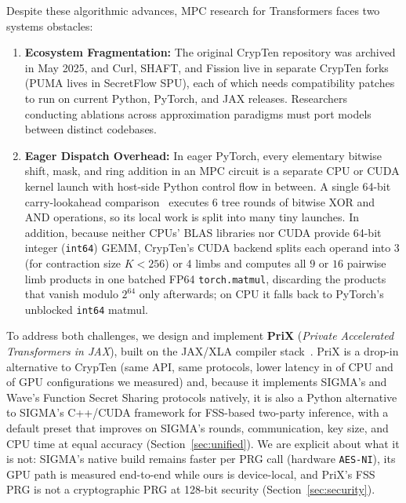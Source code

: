 \documentclass[11pt]{article}
\begin{document}
Despite these algorithmic advances, MPC research for Transformers faces two systems obstacles:
\begin{enumerate}
    \item \textbf{Ecosystem Fragmentation:} The original CrypTen repository was archived in May 2025, and Curl, SHAFT, and Fission live in separate CrypTen forks (PUMA lives in SecretFlow SPU), each of which needs compatibility patches to run on current Python, PyTorch, and JAX releases. Researchers conducting ablations across approximation paradigms must port models between distinct codebases.
    \item \textbf{Eager Dispatch Overhead:} In eager PyTorch, every elementary bitwise shift, mask, and ring addition in an MPC circuit is a separate CPU or CUDA kernel launch with host-side Python control flow in between. A single 64-bit carry-lookahead comparison~\cite{kogge1973parallel} executes 6 tree rounds of bitwise XOR and AND operations, so its local work is split into many tiny launches. In addition, because neither CPUs' BLAS libraries nor CUDA provide 64-bit integer (\texttt{int64}) GEMM, CrypTen's CUDA backend splits each operand into 3 (for contraction size $K < 256$) or 4 limbs and computes all $9$ or $16$ pairwise limb products in one batched FP64 \texttt{torch.matmul}, discarding the products that vanish modulo $2^{64}$ only afterwards; on CPU it falls back to PyTorch's unblocked \texttt{int64} matmul.
\end{enumerate}

To address both challenges, we design and implement \textbf{PriX} (\emph{Private Accelerated Transformers in JAX}), built on the JAX/XLA compiler stack~\cite{bradbury2018jax}. PriX is a drop-in alternative to CrypTen (same API, same protocols, lower latency in \cpuNumFaster{} of \cpuNumConfigs{} CPU and \gpuNumFaster{} of \gpuNumConfigs{} GPU configurations we measured) and, because it implements SIGMA's and Wave's Function Secret Sharing protocols natively, it is also a Python alternative to SIGMA's C++/CUDA framework for FSS-based two-party inference, with a default preset that improves on SIGMA's rounds, communication, key size, and CPU time at equal accuracy (Section~\ref{sec:unified}). We are explicit about what it is not: SIGMA's native build remains faster per PRG call (hardware \texttt{AES-NI}), its GPU path is measured end-to-end while ours is device-local, and PriX's FSS PRG is not a cryptographic PRG at 128-bit security (Section~\ref{sec:security}).
\end{document}
